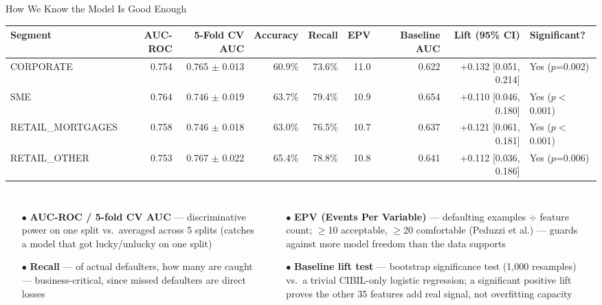 \documentclass[9pt,aspectratio=169]{beamer}
\begin{document}
\begin{frame}{How We Know the Model Is Good Enough}
\vspace{-2pt}
\begin{center}
\tiny
\setlength{\tabcolsep}{3pt}
\begin{tabular}{lrrrrrrrl}
  \toprule
  \textbf{Segment} & \textbf{AUC-ROC} & \textbf{5-Fold CV AUC} & \textbf{Accuracy} & \textbf{Recall} & \textbf{EPV} & \textbf{Baseline AUC} & \textbf{Lift (95\% CI)} & \textbf{Significant?}\\
  \midrule
  CORPORATE          & 0.754 & 0.765 $\pm$ 0.013 & 60.9\% & 73.6\% & 11.0 & 0.622 & +0.132 [0.051, 0.214] & Yes ($p$=0.002)\\
  SME                & 0.764 & 0.746 $\pm$ 0.019 & 63.7\% & 79.4\% & 10.9 & 0.654 & +0.110 [0.046, 0.180] & Yes ($p$$<$0.001)\\
  RETAIL\_MORTGAGES  & 0.758 & 0.746 $\pm$ 0.018 & 63.0\% & 76.5\% & 10.7 & 0.637 & +0.121 [0.061, 0.181] & Yes ($p$$<$0.001)\\
  RETAIL\_OTHER      & 0.753 & 0.767 $\pm$ 0.022 & 65.4\% & 78.8\% & 10.8 & 0.641 & +0.112 [0.036, 0.186] & Yes ($p$=0.006)\\
  \bottomrule
\end{tabular}
\end{center}
\vspace{8pt}
\begin{columns}[T]
    \footnotesize
    \begin{itemize}\setlength\itemsep{3pt}
      \item[\small$\bullet$] \textbf{AUC-ROC / 5-fold CV AUC} --- discriminative power on one split
            vs.\ averaged across 5 splits (catches a model that got lucky/unlucky on one split)
      \item[\small$\bullet$] \textbf{Recall} --- of actual defaulters, how many are caught ---
            business-critical, since missed defaulters are direct losses
    \end{itemize}
    \footnotesize
    \begin{itemize}\setlength\itemsep{3pt}
      \item[\small$\bullet$] \textbf{EPV (Events Per Variable)} --- defaulting examples $\div$
            feature count; $\geq$10 acceptable, $\geq$20 comfortable (Peduzzi et al.) --- guards
            against more model freedom than the data supports
      \item[\small$\bullet$] \textbf{Baseline lift test} --- bootstrap significance test (1{,}000
            resamples) vs.\ a trivial CIBIL-only logistic regression; a significant positive
            lift proves the other 35 features add real signal, not overfitting capacity
    \end{itemize}
\end{columns}
\end{frame}
\end{document}
